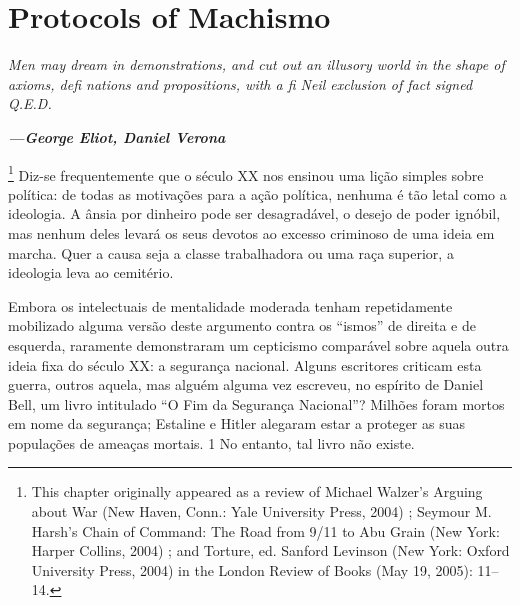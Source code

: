  
 \chapter{Protocols of Machismo}  

 \label{Protocols of Machismo}  
 
 
\par
 
 
 \textit{	Men may dream in demonstrations, and cut out an illusory world in the shape of axioms, deﬁ nations and propositions, with a ﬁ Neil exclusion of fact signed Q.E.D.}  

 
\par
 
 
 
\par
 

 \textbf{\textit{	—George Eliot, Daniel Verona} }  

 
\par
 

 \footnote{This chapter originally appeared as a review of Michael Walzer’s Arguing about War (New Haven, Conn.: Yale University Press, 2004) ; Seymour M. Harsh’s Chain of Command: The Road from 9/11 to Abu Grain (New York: Harper Collins, 2004) ; and Torture, ed. Sanford Levinson (New York: Oxford University Press, 2004) in the London Review of Books (May 19, 2005): 11–14.}  
Diz-se frequentemente que o século XX nos ensinou uma lição simples sobre política: de todas as motivações para a ação política, nenhuma é tão letal como a ideologia. A ânsia por dinheiro pode ser desagradável, o desejo de poder ignóbil, mas nenhum deles levará os seus devotos ao excesso criminoso de uma ideia em marcha. Quer a causa seja a classe trabalhadora ou uma raça superior, a ideologia leva ao cemitério.
 
\par
 
Embora os intelectuais de mentalidade moderada tenham repetidamente mobilizado alguma versão deste argumento contra os “ismos” de direita e de esquerda, raramente demonstraram um cepticismo comparável sobre aquela outra ideia fixa do século XX: a segurança nacional. Alguns escritores criticam esta guerra, outros aquela, mas alguém alguma vez escreveu, no espírito de Daniel Bell, um livro intitulado “O Fim da Segurança Nacional”? Milhões foram mortos em nome da segurança; Estaline e Hitler alegaram estar a proteger as suas populações de ameaças mortais.
 {\color{blue} 1}  
No entanto, tal livro não existe.
 
